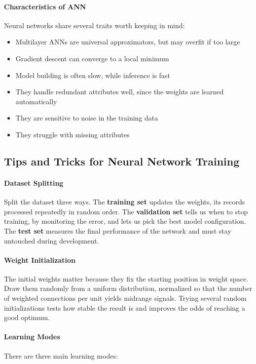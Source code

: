 \paragraph{Characteristics of ANN}
Neural networks share several traits worth keeping in mind:

\begin{itemize}
\item Multilayer ANNs are universal approximators, but may overfit if too large
\item Gradient descent can converge to a local minimum
\item Model building is often slow, while inference is fast
\item They handle redundant attributes well, since the weights are learned automatically
\item They are sensitive to noise in the training data
\item They struggle with missing attributes
\end{itemize}
\subsection{Tips and Tricks for Neural Network Training}

\paragraph{Dataset Splitting}
Split the dataset three ways. The \textbf{training set} updates the weights, its records processed repeatedly in random order. The \textbf{validation set} tells us when to stop training, by monitoring the error, and lets us pick the best model configuration. The \textbf{test set} measures the final performance of the network and must stay untouched during development.

\paragraph{Weight Initialization} The initial weights matter because they fix the starting position in weight space. Draw them randomly from a uniform distribution, normalized so that the number of weighted connections per unit yields midrange signals. Trying several random initializations tests how stable the result is and improves the odds of reaching a good optimum.

\paragraph{Learning Modes} There are three main learning modes:


